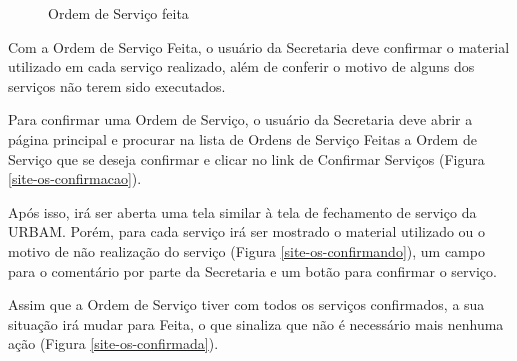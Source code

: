 \documentclass[
	article,			%
	11pt,				%
	oneside,			%
	a4paper,			%
	english,			%
	brazil,				%
	sumario=tradicional
	]{abntex2}
\begin{document}
\begin{figure}[!htbp]
 \centering
 \caption{\label{site-os-feita}Ordem de Serviço feita}
\end{figure}

Com a Ordem de Serviço Feita, o usuário da Secretaria deve confirmar o material utilizado em cada serviço realizado, além de conferir o motivo de alguns dos serviços não terem sido executados.

Para confirmar uma Ordem de Serviço, o usuário da Secretaria deve abrir a página principal e procurar na lista de Ordens de Serviço Feitas a Ordem de Serviço que se deseja confirmar e clicar no link de Confirmar Serviços (Figura \ref{site-os-confirmacao}).

Após isso, irá ser aberta uma tela similar à tela de fechamento de serviço da URBAM. Porém, para cada serviço irá ser mostrado o material utilizado ou o motivo de não realização do serviço (Figura \ref{site-os-confirmando}), um campo para o comentário por parte da Secretaria e um botão para confirmar o serviço.

Assim que a Ordem de Serviço tiver com todos os serviços confirmados, a sua situação irá mudar para Feita, o que sinaliza que não é necessário mais nenhuma ação (Figura \ref{site-os-confirmada}).
\end{document}
